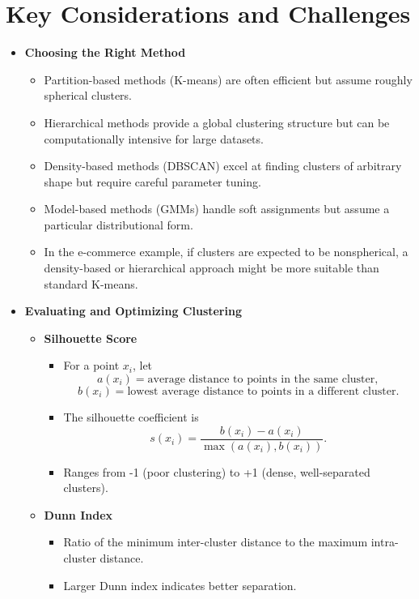 \documentclass[10pt]{article}
\begin{document}
\section{Key Considerations and Challenges}
\begin{itemize}
    \item \textbf{Choosing the Right Method}
    \begin{itemize}
        \item Partition-based methods (K-means) are often efficient but assume roughly spherical clusters.
        \item Hierarchical methods provide a global clustering structure but can be computationally intensive for large datasets.
        \item Density-based methods (DBSCAN) excel at finding clusters of arbitrary shape but require careful parameter tuning.
        \item Model-based methods (GMMs) handle soft assignments but assume a particular distributional form.
        \item In the e-commerce example, if clusters are expected to be nonspherical, a density-based or hierarchical approach might be more suitable than standard K-means.
    \end{itemize}
    \item \textbf{Evaluating and Optimizing Clustering}
    \begin{itemize}
        \item \textbf{Silhouette Score}
        \begin{itemize}
            \item For a point $x_i$, let
            \[
            a(x_i) = \text{average distance to points in the same cluster},
            \]
            \[
            b(x_i) = \text{lowest average distance to points in a different cluster}.
            \]
            \item The silhouette coefficient is
            \[
            s(x_i) = \frac{b(x_i) - a(x_i)}{\max(a(x_i), b(x_i))}.
            \]
            \item Ranges from -1 (poor clustering) to +1 (dense, well-separated clusters).
        \end{itemize}
        \item \textbf{Dunn Index}
        \begin{itemize}
            \item Ratio of the minimum inter-cluster distance to the maximum intra-cluster distance.
            \item Larger Dunn index indicates better separation.

\end{itemize}
\end{itemize}
\end{itemize}
\end{document}

